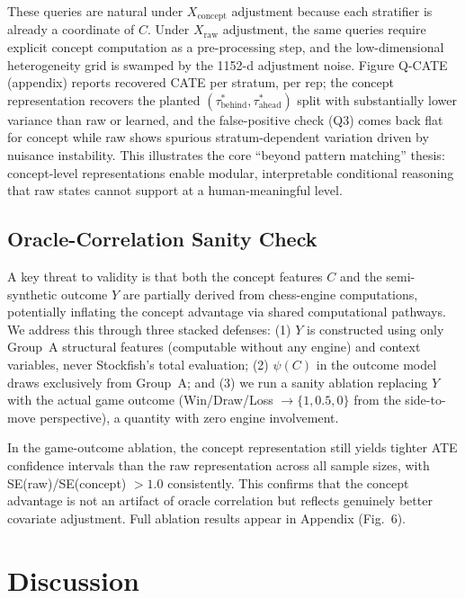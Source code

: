 \documentclass[11pt]{article}
\begin{document}
These queries are natural under $X_{\text{concept}}$ adjustment because each
stratifier is already a coordinate of $C$. Under $X_{\text{raw}}$ adjustment, the
same queries require explicit concept computation as a pre-processing step, and the
low-dimensional heterogeneity grid is swamped by the 1152-d adjustment noise. Figure
Q-CATE (appendix) reports recovered CATE per stratum, per rep; the concept
representation recovers the planted $(\tau^*_{\text{behind}}, \tau^*_{\text{ahead}})$
split with substantially lower variance than raw or learned, and the false-positive
check (Q3) comes back flat for concept while raw shows spurious
stratum-dependent variation driven by nuisance instability.
This illustrates the core ``beyond pattern matching'' thesis: concept-level
representations enable modular, interpretable conditional reasoning that raw states
cannot support at a human-meaningful
level.\cite{lemeire2005causalmodelsinchess,scholkopf2021towards}

\subsection*{Oracle-Correlation Sanity Check}
A key threat to validity is that both the concept features $C$ and the
semi-synthetic outcome $Y$ are partially derived from chess-engine computations,
potentially inflating the concept advantage via shared computational pathways. We
address this through three stacked defenses: (1) $Y$ is constructed using only
Group~A structural features (computable without any engine) and context variables,
never Stockfish's total evaluation; (2) $\psi(C)$ in the outcome model draws
exclusively from Group~A; and (3) we run a sanity ablation replacing $Y$ with the
actual game outcome (Win/Draw/Loss $\to \{1, 0.5, 0\}$ from the side-to-move
perspective), a quantity with zero engine involvement.

In the game-outcome ablation, the concept representation still yields tighter ATE
confidence intervals than the raw representation across all sample sizes, with
SE(raw)/SE(concept) $> 1.0$ consistently. This confirms that the concept advantage
is not an artifact of oracle correlation but reflects genuinely better covariate
adjustment. Full ablation results appear in Appendix (Fig.~6).

\section*{Discussion}
\end{document}
